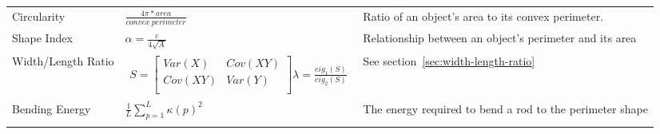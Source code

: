 \documentclass[letterpaper]{article}
\begin{document}
{{\begin{longtable}{x{\dimexpr.15\tabcolsep}
                  x{\dimexpr.425\tabcolsep}
                  x{\dimexpr.425\tabcolsep}}
		Circularity    
		& $\frac{4\pi * area}{convex~perimeter}$ 
		& Ratio of an object's area to its convex perimeter. 
\tabularnewline\addlinespace


		Shape Index    
		& $\alpha = \frac {e} {4 \sqrt{A}}$ 
		&  Relationship between an object's perimeter and its area
\tabularnewline\addlinespace

		Width/Length Ratio
		& \begin{minipage}[h]{0.10\textwidth}
			\begin{eqnarray*}
				S = 
				\begin{bmatrix}
					Var(X) & Cov(XY) \\[0.10em]
					Cov(XY) & Var(Y) \\[0.10em]
				\end{bmatrix}
			\lambda = \frac {eig_{1}(S)} {eig_{2}(S)}
			\end{eqnarray*}
		  \end{minipage}
		& See section~\ref{sec:width-length-ratio}
\tabularnewline\addlinespace

		Bending Energy    
		& $\frac{1}{L} \sum_{p=1}^{L}\kappa(p)^2$ 
		&  The energy required to bend a rod to the perimeter shape
\tabularnewline\addlinespace

\label{table:shape-formulae}
\end{longtable}
}


%
%
}
\end{document}
